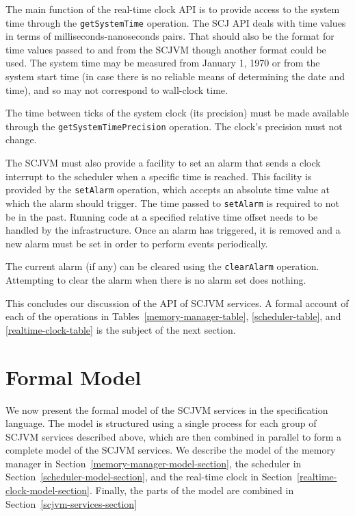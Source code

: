 The main function of the real-time clock API is to provide access to
the system time through the \texttt{get\-System\-Time} operation.
The SCJ API deals with time values in terms of
milliseconds-nanoseconds pairs.
That should also be the format for time values passed to and from the
SCJVM though another format could be used.
The system time may be measured from January 1, 1970 or from the
system start time (in case there is no reliable means of determining
the date and time), and so may not correspond to wall-clock time.

The time between ticks of the system clock (its precision) must be
made available through the \texttt{get\-System\-Time\-Precision}
operation.
The clock's precision must not change.

The SCJVM must also provide a facility to set an alarm that sends a
clock interrupt to the scheduler when a specific time is reached.
This facility is provided by the \texttt{set\-Alarm} operation, which
accepts an absolute time value at which the alarm should trigger.
The time passed to \texttt{set\-Alarm} is required to not be in the
past.
Running code at a specified relative time offset needs to be handled by
the infrastructure.
Once an alarm has triggered, it is removed and a new alarm must be set
in order to perform events periodically.

The current alarm (if any) can be cleared using the
\texttt{clear\-Alarm} operation.
Attempting to clear the alarm when there is no alarm set does nothing.

This concludes our discussion of the API of SCJVM services.
A formal account of each of the operations in
Tables~\ref{memory-manager-table}, \ref{scheduler-table}, and
\ref{realtime-clock-table} is the subject of the next section. 

\section{Formal Model}
\label{formal-model-section}

We now present the formal model of the SCJVM services in the \Circus{}
specification language.
The model is structured using a single process for each group of SCJVM
services described above, which are then combined in parallel to form
a complete model of the SCJVM services.
We describe the model of the memory manager in
Section~\ref{memory-manager-model-section}, the scheduler in
Section~\ref{scheduler-model-section}, and the real-time clock in
Section~\ref{realtime-clock-model-section}.
Finally, the parts of the model are combined in
Section~\ref{scjvm-services-section}


